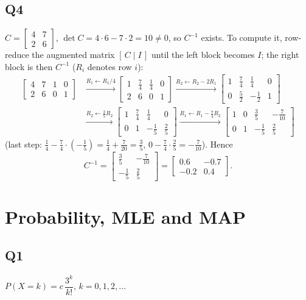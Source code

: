 \documentclass[11pt]{article}
\newcommand{\mat}[1]{\begin{bmatrix}#1\end{bmatrix}}
\begin{document}
\subsection{Q4}
$C=\mat{4&7\\2&6}$, $\det C = 4\cdot6-7\cdot2 = 10\neq0$, so $C^{-1}$ exists.
To compute it, row-reduce the augmented matrix $[\,C\mid I\,]$ until the left
block becomes $I$; the right block is then $C^{-1}$ ($R_i$ denotes row $i$):
\begin{align*}
\left[\begin{array}{cc|cc}4&7&1&0\\2&6&0&1\end{array}\right]
&\xrightarrow{R_1\leftarrow R_1/4}
\left[\begin{array}{cc|cc}1&\tfrac74&\tfrac14&0\\2&6&0&1\end{array}\right]
\xrightarrow{R_2\leftarrow R_2-2R_1}
\left[\begin{array}{cc|cc}1&\tfrac74&\tfrac14&0\\0&\tfrac52&-\tfrac12&1\end{array}\right]\\[4pt]
&\xrightarrow{R_2\leftarrow \tfrac25 R_2}
\left[\begin{array}{cc|cc}1&\tfrac74&\tfrac14&0\\0&1&-\tfrac15&\tfrac25\end{array}\right]
\xrightarrow{R_1\leftarrow R_1-\tfrac74R_2}
\left[\begin{array}{cc|cc}1&0&\tfrac35&-\tfrac7{10}\\0&1&-\tfrac15&\tfrac25\end{array}\right]
\end{align*}
(last step: $\tfrac14-\tfrac74\cdot(-\tfrac15)=\tfrac14+\tfrac7{20}=\tfrac35$,
$0-\tfrac74\cdot\tfrac25=-\tfrac7{10}$). Hence
\[
C^{-1}=\mat{\tfrac35&-\tfrac7{10}\\[2pt]-\tfrac15&\tfrac25}=\mat{0.6&-0.7\\-0.2&0.4}.
\]

\section{Probability, MLE and MAP}

\subsection{Q1}
$P(X=k)=c\,\dfrac{3^k}{k!}$, $k=0,1,2,\dots$
\end{document}
